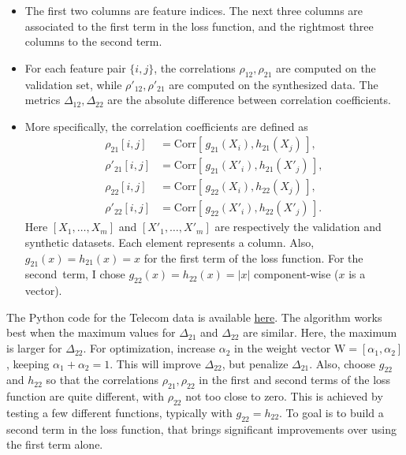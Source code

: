 \documentclass[oneside,10pt]{book}
\renewcommand{\arraystretch}{1.4} %
\begin{document}
\begin{itemize}
\item The first two columns are feature indices. The next three columns are associated to the first term in the loss function, and the rightmost three columns to the second term.
\item For each feature pair $\{i, j\}$, the correlations $\rho_{12},\rho_{21}$ are computed on the validation set, while
$\rho'_{12},\rho'_{21}$ are computed on the synthesized data. The metrics $\Delta_{12}, \Delta_{22}$ are the absolute difference between
 correlation coefficients.
\item More specifically, the correlation coefficients are defined as
\begin{align}
\rho_{21}[i, j] & =\text{Corr}[\, g_{21}(X_i), h_{21}(X_j) \,], \nonumber \\
\rho'_{21}[i, j] & =\text{Corr}[\, g_{21}(X'_i), h_{21}(X'_j) \,], \nonumber\\
\rho_{22}[i, j] & =\text{Corr}[\, g_{22}(X_i), h_{22}(X_j) \,], \nonumber \\
\rho'_{22}[i, j] & =\text{Corr}[\, g_{22}(X'_i), h_{22}(X'_j) \,].\nonumber
\end{align}
Here $[X_1,\dots,X_m]$ and $[X'_1,\dots,X'_m]$ are respectively the validation and synthetic datasets. Each element represents a column. Also,  $g_{21}(x) = h_{21}(x) = x$ for the first term of the loss function. For the second~term,  I chose $g_{22}(x) = h_{22}(x) = | x |$ component-wise ($x$ is a vector).
\end{itemize}\vspace{1ex}





The Python code for the Telecom data is available \href{https://github.com/VincentGranville/Main/blob/main/DeepResampling_telecom.py}{here}. The algorithm works best when the maximum values for $\Delta_{21}$ and $\Delta_{22}$ are similar. Here, the maximum is larger for
 $\Delta_{22}$. For optimization, increase $\alpha_2$ in the weight vector $\text{W} = [\alpha_1, \alpha_2]$, keeping $\alpha_1 + \alpha_2 = 1$. This will
 improve $\Delta_{22}$, but penalize $\Delta_{21}$.
Also, choose $g_{22}$ and $h_{22}$ so that the correlations $\rho_{21}, \rho_{22}$ in the first and second terms of the loss function are quite different, with $\rho_{22}$ not too close to zero. This is achieved by testing a few different functions, typically with $g_{22} = h_{22}$. To goal is to build a second term in the loss function, that
 brings significant improvements over using the first term alone.
\end{document}
